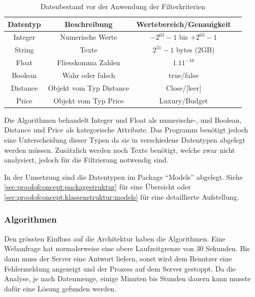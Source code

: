 \begin{table}[H] 
	\caption{Datenbestand vor der Anwendung der Filterkriterien}
	\centering
	\label{fig:proofofconcept:architektur:anforderungen:datetypen:1}
	\begin{tabular}{ | c | c | c | c | } 
		\hline 		
		\rowcolor{tableheadcolor}
		\bfseries Datentyp & Beschreibung & Wertebereich/Genauigkeit  \\ \hline 
		
		Integer & Numerische Werte & $-2^{63}-1$ bis $+2^{63}-1$ \\ \hline 
		String & Texte & $2^{31}-1$ bytes (2GB) \\ \hline 
		Float & Fliesskomma Zahlen & $1.11^{-16}$ \\ \hline 
		Boolean & Wahr oder falsch & true/false \\ \hline  
		Distance & Objekt vom Typ Distance & Close/[leer] \\ \hline 
		Price & Objekt vom Typ Price & Luxury/Budget \\ \hline 		
	\end{tabular}
\end{table}

Die Algorithmen behandelt Integer und Float als numerische-, und Boolean, Distance und Price als kategorische Attribute. Das Programm benötigt jedoch eine Unterscheidung dieser Typen da sie in verschiedene Datentypen abgelegt werden müssen. Zusätzlich werden noch Texte benötigt, welche zwar nicht analysiert, jedoch für die Filtrierung notwendig sind.

In der Umsetzung sind die Datentypen im Package "`Models"' abgelegt. Siehe \cref{sec:proofofconcept:packagestruktur}  für eine Übersicht oder \cref{sec:proofofconcept:klassenstruktur:models}  für eine detaillierte Aufstellung.

\subsubsection{Algorithmen}
\label{sec:proofofconcept:architektur:anforderungen:algorithmen}
Den grössten Einfluss auf die Architektur haben die Algorithmen. Eine Webanfrage hat normalerweise eine obere Laufzeitgrenze von 30 Sekunden. Bis dann muss der Server eine Antwort liefern, sonst wird dem Benutzer eine Fehlermeldung angezeigt und der Prozess auf dem Server gestoppt. Da die Analyse, je nach Datenmenge, einige Minuten bis Stunden dauern kann musste dafür eine Lösung gefunden werden. 

